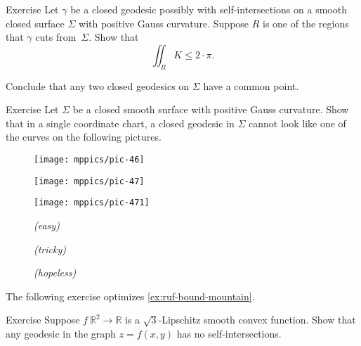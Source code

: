 \begin{thm}{Exercise}\label{ex:closed-geodesic}
Let $\gamma$ be a closed geodesic possibly with self-intersections on a smooth closed surface $\Sigma$ with positive Gauss curvature.
Suppose $R$ is one of the regions that $\gamma$ cuts from~$\Sigma$.
Show that 
\[\iint_R K\le 2\cdot\pi.\]

Conclude that any two closed geodesics on $\Sigma$ have a common point.
\end{thm}

\begin{thm}{Exercise}\label{ex:self-intersections}
Let $\Sigma$ be a closed smooth surface with positive Gauss curvature. 
Show that in a single coordinate chart, a closed geodesic in $\Sigma$ cannot look like one of the curves on the following pictures.

\begin{figure}[h]
\begin{minipage}{.32\textwidth}
\centering
\texttt{[image: mppics/pic-46]}
\end{minipage}
\hfill
\begin{minipage}{.32\textwidth}
\centering
\texttt{[image: mppics/pic-47]}
\end{minipage}
\hfill
\begin{minipage}{.32\textwidth}
\centering
\texttt{[image: mppics/pic-471]}
\end{minipage}

\medskip

\begin{minipage}{.32\textwidth}
\centering
\caption*{\textit{(easy)}}
\end{minipage}
\hfill
\begin{minipage}{.32\textwidth}
\centering
\caption*{\textit{(tricky)}}
\end{minipage}
\hfill
\begin{minipage}{.32\textwidth}
\centering
\caption*{\textit{(hopeless)}}
\end{minipage}
\end{figure}

\end{thm}


The following exercise optimizes \ref{ex:ruf-bound-mountain}.

\begin{thm}{Exercise}\label{ex:sqrt(3)}
Suppose $f\:\mathbb{R}^2\to\mathbb{R}$ is a $\sqrt{3}$-Lipschitz smooth convex function.
Show that any geodesic in the graph $z=f(x,y)$ has no self-intersections.
\end{thm}

